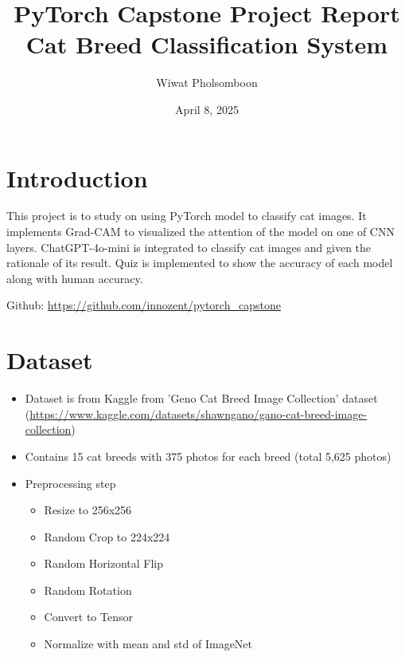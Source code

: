\documentclass{article}
\title{\textcolor{maincolor}{\Huge PyTorch Capstone Project Report}\\
\textcolor{secondcolor}{\Large Cat Breed Classification System}}
\author{\textcolor{secondcolor}{Wiwat Pholsomboon}}
\date{\textcolor{secondcolor}{April 8, 2025}}
\begin{document}
\maketitle

\section{Introduction}
This project is to study on using PyTorch model to classify cat images. It implements Grad-CAM to visualized the attention of the model on one of CNN layers. ChatGPT-4o-mini is integrated to classify cat images and given the rationale of its result. Quiz is implemented to show the accuracy of each model along with human accuracy.

Github: \href{https://github.com/innozent/pytorch_capstone}{https://github.com/innozent/pytorch\_capstone}

\section{Dataset}
\begin{itemize}
    \item Dataset is from Kaggle from 'Geno Cat Breed Image Collection' dataset (\url{https://www.kaggle.com/datasets/shawngano/gano-cat-breed-image-collection})
    \item Contains 15 cat breeds with 375 photos for each breed (total 5,625 photos)
    \item Preprocessing step
    \begin{itemize}
        \item Resize to 256x256
        \item Random Crop to 224x224
        \item Random Horizontal Flip
        \item Random Rotation
        \item Convert to Tensor
        \item Normalize with mean and std of ImageNet
    \end{itemize}
\end{itemize}
\end{document}
